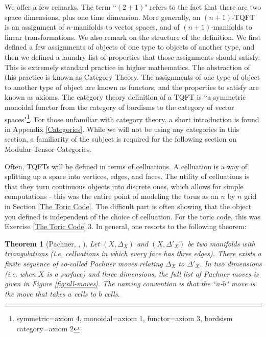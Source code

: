 \documentclass{article}
\newtheorem{theorem}{Theorem}[section]
\theoremstyle{definition}
\numberwithin{figure}{section}
\begin{document}
We offer a few remarks. The term ``$(2+1)$" refers to the fact that there are two space dimensions, plus one time dimension. More generally, an  $(n+1)$-TQFT is an assignment of $n$-manifolds to vector spaces, and of $(n+1)$-manifolds to linear transformations. We also remark on the structure of the definition. We first defined a few assignments of objects of one type to objects of another type, and then we defined a laundry list of properties that those assignments should satisfy. This is extremely standard practice in higher mathematics. The abstraction of this practice is known as Category Theory. The assignments of one type of object to another type of object are known as functors, and the properties to satisfy are known as axioms. The category theory definition of a TQFT is ``a symmetric monoidal functor from the category of bordisms to the category of vector spaces"\footnote{symmetric=axiom 4, monoidal=axiom 1, functor=axiom 3, bordsism category=axiom 2}. For those unfamiliar with category theory, a short introduction is found in Appendix \ref{Categories}. While we will not be using any categories in this section, a familiarity of the subject is required for the following section on Modular Tensor Categories.

Often, TQFTs will be defined in terms of celluations. A celluation is a way of splitting up a space into vertices, edges, and faces. The utility of celluations is that they turn continuous objects into discrete ones, which allows for simple computations - this was the entire point of modeling the torus as an $n$ by $n$ grid in Section \ref{The Toric Code}. The difficult part is often showing that the object you defined is independent of the choice of celluation. For the toric code, this was Exercise \ref{The Toric Code}.3. In general, one resorts to the following theorem:

\begin{theorem}[Pachner, \cite{pachner1991pl}, \cite{lickorish1999simplicial}]\label{Pachner} Let $(X,\Delta_X)$ and $(X,\Delta'_X)$ be two manifolds with triangulations (i.e. celluations in which every face has three edges). There exists a finite sequence of so-called Pachner moves relating $\Delta_X$ to $\Delta'_X$. In two dimensions (i.e. when $X$ is a surface) and three dimensions, the full list of Pachner moves is given in Figure \ref{fig:all-moves}. The naming convention is that the ``$a$-$b$" move is the move that takes $a$ cells to $b$ cells.
\end{theorem}
\end{document}
